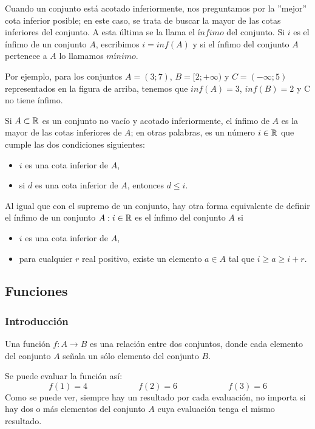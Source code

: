 \documentclass[../Teoría.root.tex]{subfiles}
\begin{document}
Cuando un conjunto está acotado inferiormente, nos preguntamos por la ”mejor” cota inferior posible; en este caso, se trata de buscar la mayor de las cotas inferiores del conjunto.
A esta última se la llama el \(\textit{ínfimo}\) del conjunto.
Si \(i\) es el ínfimo de un conjunto \(A\), escribimos \(i = inf(A)\) y si el ínfimo del conjunto \(A\) pertenece a \(A\) lo llamamos \(\textit{mínimo}\).

Por ejemplo, para los conjuntos \(A = (3; 7)\), \(B = [2; +\infty)\) y \(C = (−\infty; 5)\) representados en la figura de arriba, tenemos que \(inf(A) = 3\), \(inf(B) = 2\) y C no tiene ínfimo.

Si \(A \subset \mathbb{R}\) es un conjunto no vacío y acotado inferiormente, el ínfimo de \(A\) es la mayor de las cotas inferiores de \(A\); en otras palabras, es un número \(i \in \mathbb{R}\) que cumple las dos condiciones siguientes:
\begin{itemize}
    \item \(i\) es una cota inferior de \(A\),
    \item si \(d\) es una cota inferior de \(A\), entonces \(d \leq i\).
\end{itemize}
Al igual que con el supremo de un conjunto, hay otra forma equivalente de definir el ínfimo de un conjunto \(A: i \in \mathbb{R}\) es el ínfimo del conjunto \(A\) si
\begin{itemize}
    \item \(i\) es una cota inferior de \(A\),
    \item para cualquier \(r\) real positivo, existe un elemento \(a \in A\) tal que \(i \geq a \geq i + r\).
\end{itemize}
\subsection{Funciones}
\subsubsection{Introducción}
Una función \(f: A \rightarrow B\) es una relación entre dos conjuntos, donde cada elemento del conjunto \(A\) señala un sólo elemento del conjunto \(B\).
\begin{center}
\end{center}
Se puede evaluar la función así:
\[f(1) = 4 \qquad\qquad\qquad f(2) = 6 \qquad\qquad\qquad f(3) = 6\]
Como se puede ver, siempre hay un resultado por cada evaluación, no importa si hay dos o más elementos del conjunto \(A\) cuya evaluación tenga el mismo resultado.
\end{document}
